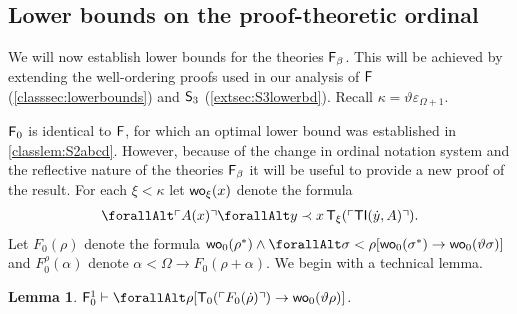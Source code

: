 \documentclass[UKenglish,cleveref,DIV=12]{scrartcl}
\let\forall\forallAlt
\newtheorem{lemma}{Lemma}
\theoremstyle{definition}
\theoremstyle{definition}
\begin{document}
\subsection{Lower bounds on the proof-theoretic ordinal}\label{extsec:Fblower}
We will now establish lower bounds for the theories $\mathsf{F}_\beta$. This will be achieved by extending the well-ordering proofs used in our analysis of $\mathsf{F}$ (\cref{classsec:lowerbounds}) and $\mathsf{S}_3$ (\cref{extsec:S3lowerbd}). Recall $\kappa=\vartheta\varepsilon_{\Omega+1}$.

%
$\mathsf{F}_0$ is identical to $\mathsf{F}$, for which an optimal lower bound was established
in \cref{classlem:S2abcd}. However, because of the change in ordinal notation
system and the reflective nature of the theories $\mathsf{F}_\beta$ it will be useful
to provide a new proof of the result.
For each $\xi<\kappa$ let $\mathsf{wo}_\xi(x)$ denote the formula
\begin{align*}
  \forall\gn {A(x)}\forall y\prec x\,\T_\xi(\gn{\TI(\dot y,A)}).
\end{align*}
Let $F_0(\rho)$ denote the formula $\wo_0(\rho^*)\land \forall\sigma<\rho[
\wo_0(\sigma^*)\rightarrow \wo_0(\vartheta\sigma)]$ and $F_0^\rho(\alpha)$ denote
$\alpha<\Omega\rightarrow F_0(\rho+\alpha)$. We begin with a technical lemma.
\begin{lemma}\label{extlem:F0tech}
 $\F_0^1\proves \forall\rho[\T_0(\gn{F_0(\dot\rho)})\rightarrow \wo_0(\vartheta\rho)]$.
\end{lemma}
\end{document}
